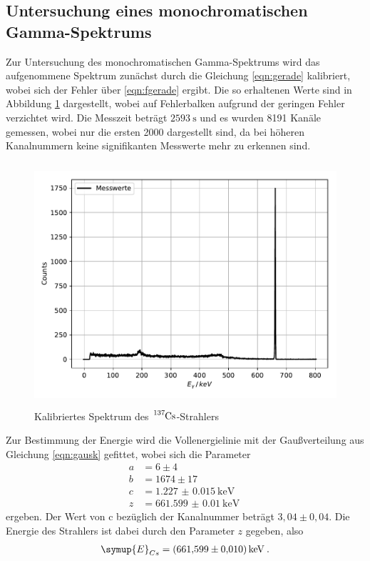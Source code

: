 \subsection{Untersuchung eines monochromatischen Gamma-Spektrums}
Zur Untersuchung des monochromatischen Gamma-Spektrums wird das aufgenommene Spektrum
zunächst durch die Gleichung \ref{eqn:gerade} kalibriert, wobei sich der Fehler über
\ref{eqn:fgerade} ergibt. Die so erhaltenen Werte sind in Abbildung \ref{fig:plot5}
dargestellt, wobei auf Fehlerbalken aufgrund der geringen Fehler verzichtet wird. Die
Messzeit beträgt $\SI{2593}{\second}$ und es wurden 8191 Kanäle gemessen, wobei nur die
ersten 2000 dargestellt sind, da bei höheren Kanalnummern keine signifikanten Messwerte
mehr zu erkennen sind.
\begin{figure}
  \centering
  \includegraphics[height=9cm]{Cs.pdf}
  \caption{Kalibriertes Spektrum des $\ce{^{137}Cs}$-Strahlers }
  \label{fig:plot5}
\end{figure}
Zur Bestimmung der Energie wird die Vollenergielinie mit der Gaußverteilung aus Gleichung
\ref{eqn:gausk} gefittet, wobei sich die Parameter
\begin{align*}
  a &= 6 \pm 4 \\
  b &= 1674 \pm 17 \\
  c &= \SI{1.227(15)}{\kilo\electronvolt}\\
  z &= \SI{661.599(10)}{\kilo\electronvolt} \:
\end{align*}
ergeben. Der Wert von c bezüglich der Kanalnummer beträgt $3,04 \pm 0,04$.
Die Energie des Strahlers ist dabei durch den Parameter $z$ gegeben, also
\begin{align*}
  \symup{E}_{Cs} = \SI{661.599(10)}{\kilo\electronvolt} \: .
\end{align*}
